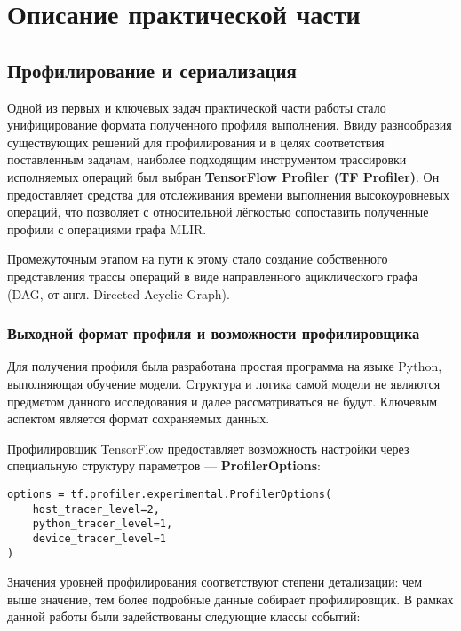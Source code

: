\section{Описание практической части}
\label{sec:Chapter3} 

\subsection{Профилирование и сериализация}

Одной из первых и ключевых задач практической части работы стало унифицирование формата полученного профиля выполнения.
Ввиду разнообразия существующих решений для профилирования и в целях соответствия поставленным задачам, наиболее подходящим инструментом трассировки исполняемых операций был выбран \textbf{TensorFlow Profiler (TF Profiler)}.
Он предоставляет средства для отслеживания времени выполнения высокоуровневых операций, что позволяет с относительной лёгкостью сопоставить полученные профили с операциями графа MLIR.

Промежуточным этапом на пути к этому стало создание собственного представления трассы операций в виде направленного ациклического графа (DAG, от англ. Directed Acyclic Graph).

\subsubsection{Выходной формат профиля и возможности профилировщика}

Для получения профиля была разработана простая программа на языке Python, выполняющая обучение модели.
Структура и логика самой модели не являются предметом данного исследования и далее рассматриваться не будут.
Ключевым аспектом является формат сохраняемых данных.

Профилировщик TensorFlow предоставляет возможность настройки через специальную структуру параметров — \textbf{ProfilerOptions}:

\begin{lstlisting}[caption={Опции профилирования \textbf{TF Profiler}}]
options = tf.profiler.experimental.ProfilerOptions(
    host_tracer_level=2,
    python_tracer_level=1,
    device_tracer_level=1
)
\end{lstlisting}

Значения уровней профилирования соответствуют степени детализации: чем выше значение, тем более подробные данные собирает профилировщик.
В рамках данной работы были задействованы следующие классы событий:

